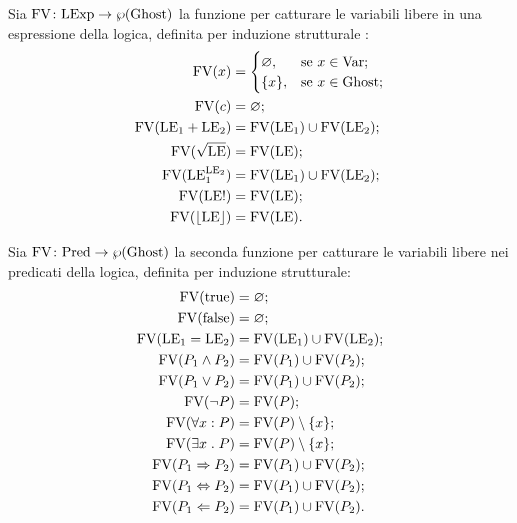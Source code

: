 \begin{definizione} 
Sia $\mathord{\mathrm{FV}}\colon\mathrm{LExp}\to\wp(\mathrm{Ghost})$ la funzione per catturare le variabili libere in una espressione della logica, definita per induzione strutturale :
\begin{align*}
   \mathrm{FV}(x)
      &=
        \begin{cases}
            \varnothing,&\text{se $x  \in \mathrm{Var}$};\\
            \{x\},    &\text{se $x  \in \mathrm{Ghost}$};
        \end{cases} \\
   \mathrm{FV}(c)
      &= \varnothing;\\
   \mathrm{FV}(\mathrm{LE}_1 + \mathrm{LE}_2)
      &= \mathrm{FV}(\mathrm{LE}_1) \cup \mathrm{FV}(\mathrm{LE}_2);\\
   \mathrm{FV}(\sqrt{\mathrm{LE}})
      &= \mathrm{FV}(\mathrm{LE});\\
   \mathrm{FV}(\mathrm{LE}_1^{\mathrm{LE}_2})
      &= \mathrm{FV}(\mathrm{LE}_1) \cup \mathrm{FV}(\mathrm{LE}_2);\\
   \mathrm{FV}(\mathrm{LE}!)
      &= \mathrm{FV}(\mathrm{LE});\\
   \mathrm{FV}(\lfloor \mathrm{LE} \rfloor)
      &= \mathrm{FV}(\mathrm{LE}).
\end{align*}
\end{definizione}

\begin{definizione} 
Sia $\mathord{\mathrm{FV}}\colon\mathrm{Pred}\to\wp(\mathrm{Ghost})$ la seconda funzione per catturare
le variabili libere nei predicati della logica,
definita per induzione strutturale:
\begin{align*}
   \mathrm{FV}(\mathrm{true})
      &= \varnothing;\\
   \mathrm{FV}(\mathrm{false})
      &= \varnothing;\\
   \mathrm{FV}(\mathrm{LE}_1 = \mathrm{LE}_2)
      &= \mathrm{FV}(\mathrm{LE}_1) \cup \mathrm{FV}(\mathrm{LE}_2);\\
   \mathrm{FV}(P_1 \land P_2)
      &= \mathrm{FV}(P_1) \cup \mathrm{FV}(P_2);\\
   \mathrm{FV}(P_1 \lor P_2)
      &= \mathrm{FV}(P_1) \cup \mathrm{FV}(P_2);\\
   \mathrm{FV}(\neg P)
      &= \mathrm{FV}(P);\\
   \mathrm{FV}(\forall x \mathrel{:} P)
      &= \mathrm{FV}(P)\setminus \{x\};\\
   \mathrm{FV}(\exists x \mathrel{.} P)
      &= \mathrm{FV}(P)\setminus \{x\};\\
   \mathrm{FV}(P_1 \Rightarrow P_2)
      &= \mathrm{FV}(P_1) \cup \mathrm{FV}(P_2);\\
   \mathrm{FV}(P_1 \Leftrightarrow P_2)
      &= \mathrm{FV}(P_1) \cup \mathrm{FV}(P_2);\\
   \mathrm{FV}(P_1 \Leftarrow P_2)
      &= \mathrm{FV}(P_1) \cup \mathrm{FV}(P_2).
\end{align*}
\end{definizione}

